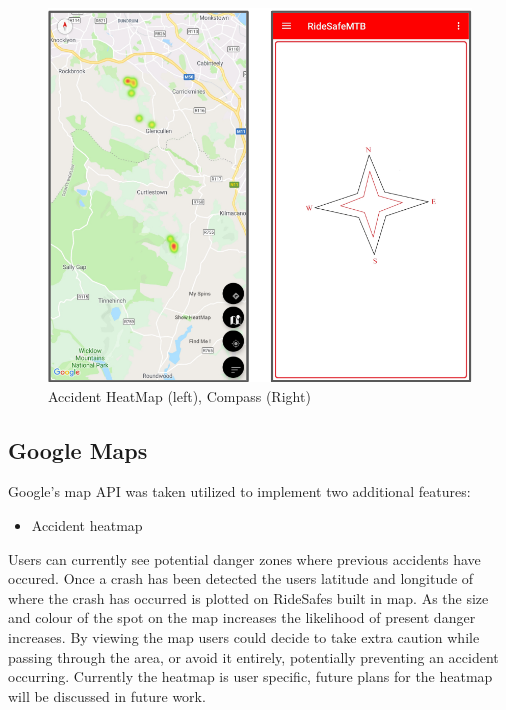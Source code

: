 \begin{figure}[h]
      \centering
      \includegraphics[scale = .9]{implementation/cm.png}
      \caption{Accident HeatMap (left), Compass (Right)}
      \label{cm}
\end{figure}

\subsection{Google Maps}

Google's map API was taken utilized to implement two additional features:
\begin{itemize}
\item Accident heatmap 
\end{itemize}

Users can currently see potential danger zones where previous accidents have occured. Once a crash has been detected the users latitude and longitude of where the crash has occurred is plotted on RideSafes built in map. As the size and colour of the spot on the map increases the likelihood of present danger increases. By viewing the map users could decide to take extra caution while passing through the area, or avoid it entirely, potentially preventing an accident occurring. Currently the heatmap is user specific, future plans for the heatmap will be discussed in future work.   

